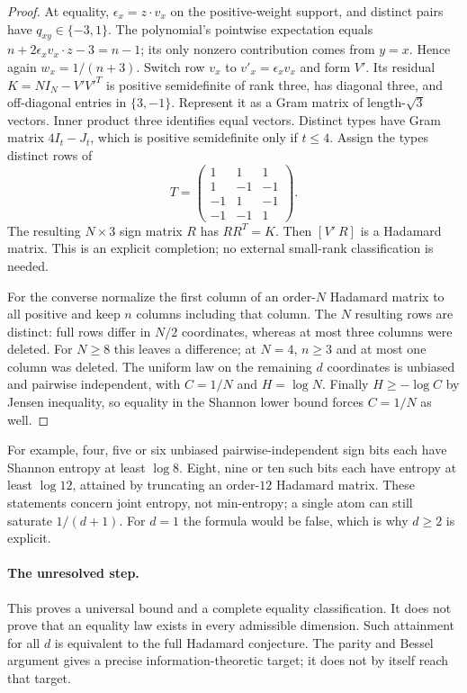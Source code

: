 \documentclass[11pt]{article}
\begin{document}
\begin{proof}
At equality, $\epsilon_x=z\cdot v_x$ on the positive-weight support,
and distinct pairs have $q_{xy}\in\{-3,1\}$. The polynomial's
pointwise expectation equals
$n+2\epsilon_xv_x\cdot z-3=n-1$; its only nonzero contribution
comes from $y=x$. Hence again $w_x=1/(n+3)$.
Switch row $v_x$ to $v'_x=\epsilon_xv_x$ and form $V'$.
Its residual $K=NI_N-V'V'^T$ is positive semidefinite of rank three,
has diagonal three, and off-diagonal entries in $\{3,-1\}$.
Represent it as a Gram matrix of length-$\sqrt3$ vectors. Inner
product three identifies equal vectors. Distinct types have Gram
matrix $4I_t-J_t$, which is positive semidefinite only if $t\le4$.
Assign the types distinct rows of
\[
 T=\begin{pmatrix}1&1&1\\1&-1&-1\\-1&1&-1\\-1&-1&1\end{pmatrix}.
\]
The resulting $N\times3$ sign matrix $R$ has $RR^T=K$.
Then $[V'\ R]$ is a Hadamard matrix. This is an explicit completion;
no external small-rank classification is needed.

For the converse normalize the first column of an order-$N$ Hadamard
matrix to all positive and keep $n$ columns including that column.
The $N$ resulting rows are distinct: full rows differ in $N/2$
coordinates, whereas at most three columns were deleted. For $N\ge8$
this leaves a difference; at $N=4$, $n\ge3$ and at most one column
was deleted. The uniform law on the remaining $d$ coordinates is
unbiased and pairwise independent, with $C=1/N$ and $H=\log N$.
Finally $H\ge-\log C$ by Jensen inequality, so equality in the Shannon
lower bound forces $C=1/N$ as well.
\end{proof}

For example, four, five or six unbiased pairwise-independent sign bits
each have Shannon entropy at least $\log8$. Eight, nine or ten such
bits each have entropy at least $\log12$, attained by truncating an
order-$12$ Hadamard matrix. These statements concern joint entropy,
not min-entropy; a single atom can still saturate $1/(d+1)$.
For $d=1$ the formula would be false, which is why $d\ge2$ is explicit.

\paragraph{The unresolved step.}
This proves a universal bound and a complete equality classification.
It does not prove that an equality law exists in every admissible
dimension. Such attainment for all $d$ is equivalent to the full
Hadamard conjecture. The parity and Bessel argument gives a precise
information-theoretic target; it does not by itself reach that target.
\end{document}
